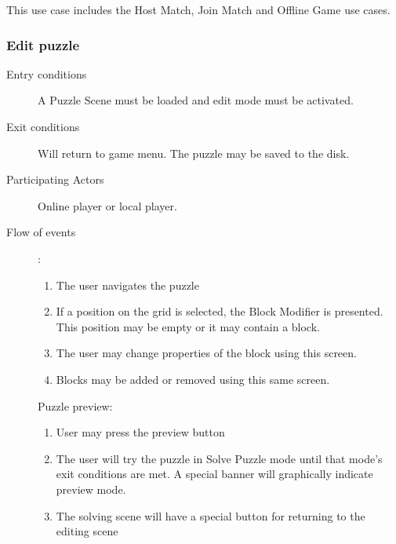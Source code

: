 \documentclass[12pt]{article}
\begin{document}
\begin{mdframed}
    This use case includes the Host Match, Join Match and Offline Game
    use cases.
    \subsubsection{Edit puzzle}
    \begin{description}
        \item[Entry conditions] A Puzzle Scene must be loaded and edit mode
            must be activated.
        \item[Exit conditions] Will return to game menu. The puzzle may be
            saved to the disk.
        \item[Participating Actors] Online player or local player.
        \item[Flow of events]:
            \begin{enumerate}
                \item The user navigates the puzzle
                \item If a position on the grid is selected, the Block Modifier
                    is presented. This position may be empty or it may
                    contain a block.
                \item The user may change properties of the block using this
                    screen.
                \item Blocks may be added or removed using this same screen.
            \end{enumerate}
            Puzzle preview:
            \begin{enumerate}
                \item User may press the preview button
                \item The user will try the puzzle in Solve Puzzle mode until
                    that mode's exit conditions are met.
                    A special banner will graphically indicate preview mode.
                \item The solving scene will have a special button for
                    returning to the editing scene
            \end{enumerate}
    \end{description}
\end{mdframed}
\end{document}
